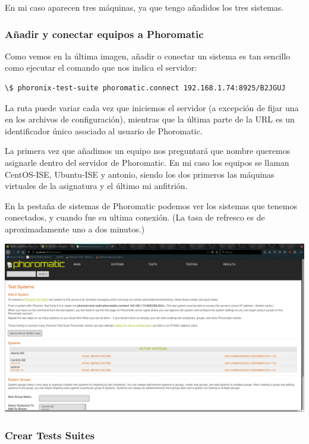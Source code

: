 \documentclass[12pt, spanish]{article}
\begin{document}
En mi caso aparecen tres máquinas, ya que tengo añadidos los tres sistemas.

\subsubsection{Añadir y conectar equipos a Phoromatic}

Como vemos en la última imagen, añadir o conectar un sistema es tan sencillo como ejecutar el comando que nos indica el servidor:

\begin{verbatim}
\$ phoronix-test-suite phoromatic.connect 192.168.1.74:8925/B2JGUJ
\end{verbatim}

La ruta puede variar cada vez que iniciemos el servidor (a excepción de fijar una en los archivos de configuración), mientras que la última parte de la URL es un identificador único asociado al usuario de Phoromatic.

La primera vez que añadimos un equipo nos preguntará que nombre queremos asignarle dentro del servidor de Phoromatic. En mi caso los equipos se llaman CentOS-ISE, Ubuntu-ISE y antonio, siendo los dos primeros las máquinas virtuales de la asignatura y el último mi anfitrión.

En la pestaña de sistemas de Phoromatic podemos ver los sistemas que tenemos conectados, y cuando fue su ultima conexión. (La tasa de refresco es de aproximadamente uno a dos minutos.)

\begin{center}
\includegraphics[scale=0.25]{phoromatic_systems.png}
\end{center}

\subsubsection{Crear Tests Suites}
\end{document}
